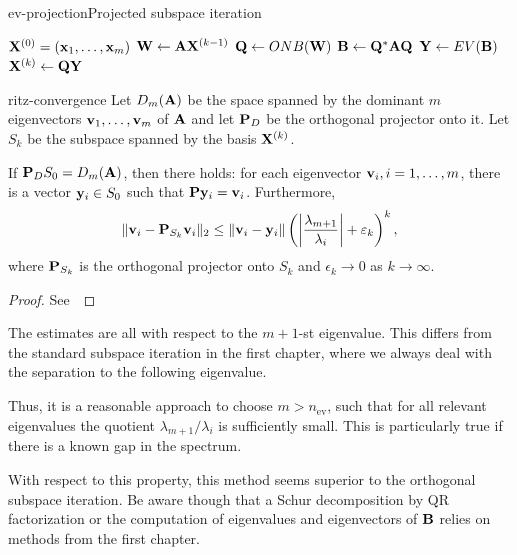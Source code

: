 \begin{Algorithm*}{ev-projection}{Projected subspace iteration}
  \begin{algorithmic}[1]
    \Require $\matx^{(0)} = (\vx_1,\dots,\vx_m)$
    \State $\matw \gets \mata\matx^{(k-1)}$
    \State $\matq \gets ONB(\matw)$ 
    \State $\matb \gets \matq^*\mata\matq$ 
    \State $\maty \gets EV(\matb)$ 
    \State $\matx^{(k)} \gets \matq\maty$
    \EndFor
  \end{algorithmic}
\end{Algorithm*}

\begin{Theorem}{ritz-convergence}
  Let $D_m(\mata)$ be the space spanned by the dominant $m$
  eigenvectors $\vv_1,\dots,\vv_m$ of $\mata$ and let $\matp_D$ be the
  orthogonal projector onto it. Let $S_k$ be the subspace spanned by
  the basis $\matx^{(k)}$.
  
  If $\matp_D S_0 = D_m(\mata)$, then there holds: for each
  eigenvector $\vv_i, i=1,\dots,m$, there is a vector
  $\vy_i\in S_0$ such that $\matp\vy_i = \vv_i$. Furthermore,
  \begin{gather}
    \norm{\vv_i - \matp_{S_k} \vv_i}_2 \le \norm{\vv_i-\vy_i}
    \left(\abs*{\frac{\lambda_{m+1}}{\lambda_i}}+\epsilon_k\right)^k,
  \end{gather}
  where $\matp_{S_k}$ is the orthogonal projector onto $S_k$ and
  $\epsilon_k\to 0$ as $k \to \infty$.
\end{Theorem}

\begin{proof}
  See~\cite[Theorem 5.2]{Saad11}
\end{proof}

\begin{remark}
  The estimates are all with respect to the $m+1$-st eigenvalue. This
  differs from the standard subspace iteration in the first chapter,
  where we always deal with the separation to the following
  eigenvalue.
  
  Thus, it is a reasonable approach to choose $m > n_{\text{ev}}$,
  such that for all relevant eigenvalues the quotient
  $\lambda_{m+1}/\lambda_i$ is sufficiently small. This is
  particularly true if there is a known gap in the spectrum.

  With respect to this property, this method seems superior to the
  orthogonal subspace iteration. Be aware though that a Schur
  decomposition by QR factorization or the computation of eigenvalues
  and eigenvectors of $\matb$ relies on methods from the first
  chapter.
\end{remark}



